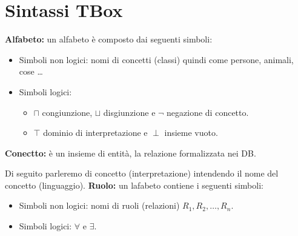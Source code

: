\documentclass[../main.tex]{subfiles}
\newcommand{\spazio}{\vspace{2em} \newline}
\begin{document}
   \section{Sintassi TBox}
   \textbf{Alfabeto:} un alfabeto è composto dai seguenti simboli:
   \begin{itemize}
      \item Simboli non logici: nomi di concetti (classi) quindi come persone, animali, cose \dots
      \item Simboli logici: 
         \begin{itemize}
            \item $\sqcap$ congiunzione, $\sqcup$ disgiunzione e $\lnot$ negazione di concetto.
            \item $\top$ dominio di interpretazione e $\perp$ insieme vuoto.
         \end{itemize}
   \end{itemize}
   \textbf{Conectto:} è un insieme di entità, la relazione formalizzata nei DB.

   Di seguito parleremo di concetto (interpretazione) intendendo il nome del concetto (linguaggio). 
   \spazio
   \textbf{Ruolo:} un lafabeto contiene i seguenti simboli:
   \begin{itemize}
      \item Simboli non logici: nomi di ruoli (relazioni) $R_1, R_2, \dots , R_n$.
      \item Simboli logici: $\forall$ e $\exists$.
   \end{itemize}
\end{document}
